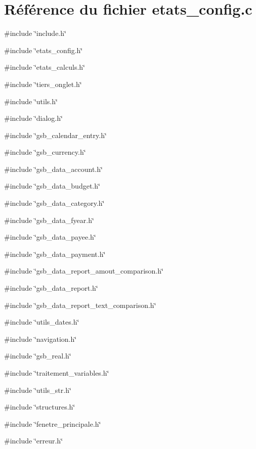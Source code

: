 \section{Référence du fichier etats\_\-config.c}
\label{etats__config_8c}
{\ttfamily \#include \char`\"{}include.h\char`\"{}}\par
{\ttfamily \#include \char`\"{}etats\_\-config.h\char`\"{}}\par
{\ttfamily \#include \char`\"{}etats\_\-calculs.h\char`\"{}}\par
{\ttfamily \#include \char`\"{}tiers\_\-onglet.h\char`\"{}}\par
{\ttfamily \#include \char`\"{}utils.h\char`\"{}}\par
{\ttfamily \#include \char`\"{}dialog.h\char`\"{}}\par
{\ttfamily \#include \char`\"{}gsb\_\-calendar\_\-entry.h\char`\"{}}\par
{\ttfamily \#include \char`\"{}gsb\_\-currency.h\char`\"{}}\par
{\ttfamily \#include \char`\"{}gsb\_\-data\_\-account.h\char`\"{}}\par
{\ttfamily \#include \char`\"{}gsb\_\-data\_\-budget.h\char`\"{}}\par
{\ttfamily \#include \char`\"{}gsb\_\-data\_\-category.h\char`\"{}}\par
{\ttfamily \#include \char`\"{}gsb\_\-data\_\-fyear.h\char`\"{}}\par
{\ttfamily \#include \char`\"{}gsb\_\-data\_\-payee.h\char`\"{}}\par
{\ttfamily \#include \char`\"{}gsb\_\-data\_\-payment.h\char`\"{}}\par
{\ttfamily \#include \char`\"{}gsb\_\-data\_\-report\_\-amout\_\-comparison.h\char`\"{}}\par
{\ttfamily \#include \char`\"{}gsb\_\-data\_\-report.h\char`\"{}}\par
{\ttfamily \#include \char`\"{}gsb\_\-data\_\-report\_\-text\_\-comparison.h\char`\"{}}\par
{\ttfamily \#include \char`\"{}utils\_\-dates.h\char`\"{}}\par
{\ttfamily \#include \char`\"{}navigation.h\char`\"{}}\par
{\ttfamily \#include \char`\"{}gsb\_\-real.h\char`\"{}}\par
{\ttfamily \#include \char`\"{}traitement\_\-variables.h\char`\"{}}\par
{\ttfamily \#include \char`\"{}utils\_\-str.h\char`\"{}}\par
{\ttfamily \#include \char`\"{}structures.h\char`\"{}}\par
{\ttfamily \#include \char`\"{}fenetre\_\-principale.h\char`\"{}}\par
{\ttfamily \#include \char`\"{}erreur.h\char`\"{}}\par
